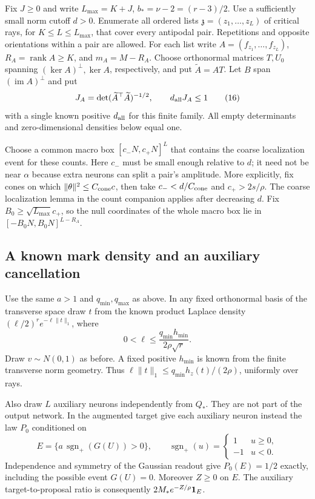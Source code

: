 \documentclass[11pt]{article}
\begin{document}
Fix $J\ge0$ and write $L_{\max}=K+J$, $b_*=\nu-2=(r-3)/2$.
Use a sufficiently small norm cutoff $d>0$. Enumerate all ordered lists
$\mathfrak z=(z_1,\ldots,z_L)$ of critical rays, for
$K\le L\le L_{\max}$, that cover every antipodal pair. Repetitions and
opposite orientations within a pair are allowed. For each list write
$A=(f_{z_1},\ldots,f_{z_L})$, $R_A=\operatorname{rank}A\ge K$,
and $m_A=M-R_A$. Choose orthonormal matrices $T,U_0$ spanning
$(\ker A)^\perp,\ker A$, respectively, and put $\widetilde A=AT$.
Let $B$ span $(\operatorname{im}A)^\perp$ and put
\[
 J_A=\det(\widetilde A^\top\widetilde A)^{-1/2},\qquad
             d_{\rm all}J_A\le1                       \tag{16}
\]
with a single known positive $d_{\rm all}$ for this finite family.
All empty determinants and zero-dimensional densities below equal one.

Choose a common macro box $[c_-N,c_+N]^L$ that contains the coarse
localization event for these counts. Here $c_-$ must be small enough
relative to $d$; it need not be near $\alpha$ because extra neurons can
split a pair's amplitude. More explicitly, fix cones on which
$\|\theta\|^2\le C_{\rm cone}c$, then take
$c_-<d/C_{\rm cone}$ and $c_+>2s/\rho$. The coarse localization lemma
in the count companion applies after decreasing $d$. Fix
$B_0\ge\sqrt{L_{\max}}c_+$, so the null coordinates of the whole macro
box lie in $[-B_0N,B_0N]^{L-R_A}$.

\subsection{A known mark density and an auxiliary cancellation}
Use the same $a>1$ and $q_{\min},q_{\max}$ as above. In any fixed
orthonormal basis of the transverse space draw $t$ from the known product
Laplace density $(\ell/2)^r e^{-\ell\|t\|_1}$, where
\[
 0<\ell\le\frac{q_{\min}h_{\min}}{2\rho\sqrt r}.
                                                               \tag{17}
\]
Draw $v\sim N(0,1)$ as before. A fixed positive $h_{\min}$ is known
from the finite transverse norm geometry. Thus
$\ell\|t\|_1\le q_{\min}h_z(t)/(2\rho)$, uniformly over rays.

Also draw $L$ auxiliary neurons independently from $Q_*$. They are not
part of the output network. In the augmented target give each auxiliary
neuron instead the law $P_0$ conditioned on
\[
 E=\{a\,\operatorname{sgn}_+(G(U))>0\},\qquad
 \operatorname{sgn}_+(u)=\begin{cases}1&u\ge0,\\-1&u<0.\end{cases}
                                                               \tag{18}
\]
Independence and symmetry of the Gaussian readout give $P_0(E)=1/2$
exactly, including the possible event $G(U)=0$. Moreover $Z\ge0$ on
$E$. The auxiliary target-to-proposal ratio is consequently
$2M_*e^{-Z/\rho}\mathbf1_E$.
\end{document}

